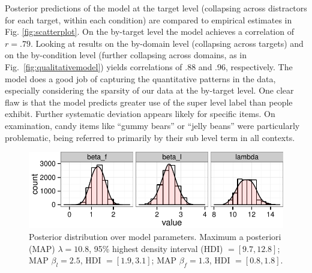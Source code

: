 \documentclass[10pt,letterpaper]{article}
\newcommand{\figref}[1]{Fig.~\ref{#1}}
\begin{document}
Posterior predictions of the model at the target level (collapsing across distractors for each target, within each condition) are compared to empirical estimates in Fig. \ref{fig:scatterplot}. On the by-target level the model achieves a correlation of $r = .79$. Looking at results on the by-domain level (collapsing across targets) and on the by-condition level (further collapsing across domains, as in \figref{fig:qualitativemodel}) yields correlations of .88 and .96, respectively. 
The model does a good job of capturing the quantitative patterns in the data, especially considering the sparsity of our data at the by-target level.
One clear flaw is that the model predicts greater use of the super level label than people exhibit.
Further systematic deviation appears likely for specific items. 
On examination, candy items like ``gummy bears'' or ``jelly beans'' were particularly problematic, being referred to primarily by their sub level term in all contexts.

\begin{figure}
\includegraphics[width=.45\textwidth]{graphs/parameterposteriors.pdf}
\caption{Posterior distribution over model parameters. Maximum a posteriori (MAP) $\lambda = 10.8$, 95\% highest density interval (HDI) $= [9.7, 12.8]$; MAP $\beta_l = 2.5$, HDI $= [1.9, 3.1]$; MAP $\beta_f = 1.3$, HDI $= [0.8, 1.8]$.}
\label{fig:paramposteriors}
\end{figure}
\end{document}
